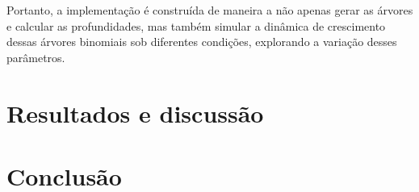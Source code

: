 \documentclass[12pt, a4paper]{scrreprt}
\begin{document}
Portanto, a implementação é construída de maneira a não apenas gerar as árvores e calcular as profundidades, mas também simular a dinâmica de crescimento dessas árvores binomiais sob diferentes condições, explorando a variação desses parâmetros.

\chapter{Resultados e discussão}

\chapter{Conclusão}

\printbibliography %


\end{document}
